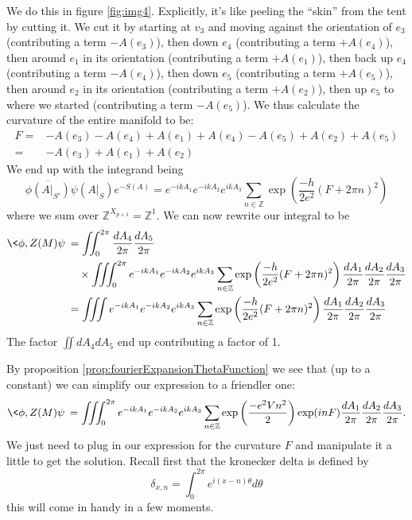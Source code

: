 We do this in figure \ref{fig:img4}. Explicitly, it's like 
peeling the ``skin'' from the tent by cutting it. We cut it by
starting at $v_{3}$ and moving against the orientation of $e_{3}$
(contributing a term $-A(e_{3})$), then down $e_{4}$
(contributing a term $+A(e_{4})$), then around $e_{1}$ in its
orientation (contributing a term $+A(e_{1})$), then back up
$e_{4}$ (contributing a term $-A(e_{4})$), then down $e_{5}$
(contributing a term $+A(e_{5})$), then around $e_{2}$ in its
orientation (contributing a term $+A(e_{2})$), then up $e_{5}$ to
where we started (contributing a term $-A(e_{5})$). We thus calculate
the curvature of the entire manifold to be:
\begin{equation}%
\begin{split}
F =&
-A(e_{3})-A(e_{4})+A(e_{1})+A(e_{4})-A(e_{5})+A(e_{2})+A(e_{5}) \\
=& -A(e_{3})+A(e_{1})+A(e_{2})
\end{split}
\end{equation}
We end up with the integrand being
\begin{equation}%
\overline{\phi(A|_{S'})}\psi(A|_{S}) e^{-S(A)}=e^{-ikA_{1}}e^{-ikA_{2}}e^{ikA_{3}}\sum_{n\in\mathbb{Z}}\exp\left(\frac{-h}{2e^{2}}(F+2\pi n)^{2}\right)
\end{equation}
where we sum over $\mathbb{Z}^{X_{p+1}}=\mathbb{Z}^{1}$. We can
now rewrite our integral to be
\begin{align*}%
\<\phi,Z(M)\psi\> &=\iint^{2\pi}_{0}\frac{dA_{4}}{2\pi}\frac{dA_{5}}{2\pi}\\
&\quad\times\iiint^{2\pi}_{0}e^{-ikA_{1}}e^{-ikA_{2}}e^{ikA_{3}}\sum_{n\in\mathbb{Z}}\exp\left(\frac{-h}{2e^{2}}(F+2\pi n)^{2}\right)\frac{dA_{1}}{2\pi}\frac{dA_{2}}{2\pi}\frac{dA_{3}}{2\pi}\\
&= \iiint e^{-ikA_{1}}e^{-ikA_{2}}e^{ikA_{3}}\sum_{n\in\mathbb{Z}}\exp\left(\frac{-h}{2e^{2}}(F+2\pi n)^{2}\right)\frac{dA_{1}}{2\pi}\frac{dA_{2}}{2\pi}\frac{dA_{3}}{2\pi}
\end{align*}
The factor $\iint dA_{4}dA_{5}$ end up contributing a factor
of 1. 

By proposition \eqref{prop:fourierExpansionThetaFunction} we see
that (up to a constant) we can simplify our expression to a
friendler one:
\begin{equation}%
\<\phi,Z(M)\psi\> = \iiint^{2\pi}_{0}e^{-ikA_{1}}e^{-ikA_{2}}e^{ikA_{3}}\sum_{n\in\mathbb{Z}}\exp\left(\frac{-e^{2}Vn^{2}}{2}\right)\exp(inF)\frac{dA_{1}}{2\pi}\frac{dA_{2}}{2\pi}\frac{dA_{3}}{2\pi}.
\end{equation}
We just need to plug in our expression for the curvature $F$ and
manipulate it a little to get the solution. Recall first that the
kronecker delta is defined by
\begin{equation}%
\delta_{x,n} = \int^{2\pi}_{0} e^{i(x-n)\theta}d\theta
\end{equation}
this will come in handy in a few moments.

